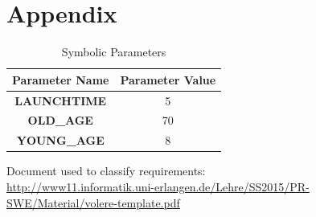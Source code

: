 \documentclass{article}
\begin{document}
\section{Appendix}
\begin{table}[h!]
\centering
\caption{Symbolic Parameters}
\label{my-label}
\begin{tabular}{cc}
\hline
\multicolumn{1}{l}{\textbf{Parameter Name}} & \multicolumn{1}{l}{\textbf{Parameter Value}} \\ \hline
\textbf{LAUNCHTIME}                         & 5                                            \\ \hline
\textbf{OLD\_AGE}                           & 70                                           \\ \hline
\textbf{YOUNG\_AGE}                         & 8                                            \\ \hline
\end{tabular}
\end{table}

\noindent
Document used to classify requirements:\\ \url{http://www11.informatik.uni-erlangen.de/Lehre/SS2015/PR-SWE/Material/volere-template.pdf}
\end{document}
